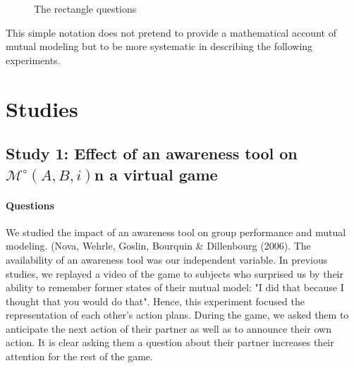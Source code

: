 \documentclass[twocolumn]{article}
\newcommand{\Model}[3]{{$\mathcal{M}^{\circ}(#1, #2, #3)$}}
\begin{document}
\begin{figure}[htb]
\centering


\caption{The rectangle questions}

\label{mm_rectangle}
\end{figure}


This simple notation does not pretend to provide a mathematical account of
mutual modeling but to be more systematic in describing the following
experiments. 

\section{Studies}

\subsection{Study 1: Effect of an awareness tool on \Model{A}{B} in a virtual
game}

\paragraph{Questions}

We studied the impact of an awareness tool on group performance and mutual
modeling. (Nova, Wehrle, Goslin, Bourquin \& Dillenbourg (2006). The availability
of an awareness tool was our independent variable. In previous studies, we
replayed a video of the game to subjects who surprised us by their ability to
remember former states of their mutual model: "I did that because I thought that
you would do that". Hence, this experiment focused the representation of each
other's action plans. During the game, we asked them to anticipate the next
action of their partner as well as to announce their own action. It is clear
asking them a question about their partner increases their attention for the
rest of the game.
\end{document}
